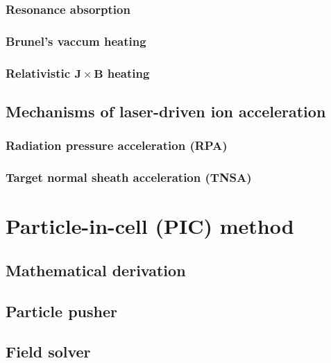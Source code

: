 \documentclass[12pt, twoside, a4paper, openright]{report}
\renewcommand{\vec}[1]{\mathbf{#1}}
\begin{document}
\subsection{Resonance absorption}


\subsection{Brunel's vaccum heating}


\subsection{Relativistic $ \vec{J} \times \vec{B} $ heating}


\section{Mechanisms of laser-driven ion acceleration}


\subsection{Radiation pressure acceleration (RPA)}


\subsection{Target normal sheath acceleration (TNSA)}



\chapter{Particle-in-cell (PIC) method}


\section{Mathematical derivation}


\section{Particle pusher}


\section{Field solver}

\end{document}
